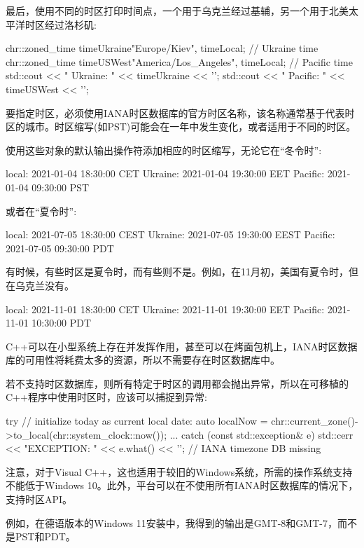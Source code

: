 
最后，使用不同的时区打印时间点，一个用于乌克兰经过基辅，另一个用于北美太平洋时区经过洛杉矶:

\begin{cpp}
chr::zoned_time timeUkraine{"Europe/Kiev", timeLocal}; // Ukraine time
chr::zoned_time timeUSWest{"America/Los_Angeles", timeLocal}; // Pacific time
std::cout << " Ukraine: " << timeUkraine << '\n';
std::cout << " Pacific: " << timeUSWest << '\n';
\end{cpp}

要指定时区，必须使用IANA时区数据库的官方时区名称，该名称通常基于代表时区的城市。时区缩写(如PST)可能会在一年中发生变化，或者适用于不同的时区。

使用这些对象的默认输出操作符添加相应的时区缩写，无论它在“冬令时”:

\begin{shell}
local:   2021-01-04 18:30:00 CET
Ukraine: 2021-01-04 19:30:00 EET
Pacific: 2021-01-04 09:30:00 PST
\end{shell}

或者在“夏令时”:

\begin{shell}
local:   2021-07-05 18:30:00 CEST
Ukraine: 2021-07-05 19:30:00 EEST
Pacific: 2021-07-05 09:30:00 PDT
\end{shell}

有时候，有些时区是夏令时，而有些则不是。例如，在11月初，美国有夏令时，但在乌克兰没有。

\begin{shell}
local:   2021-11-01 18:30:00 CET
Ukraine: 2021-11-01 19:30:00 EET
Pacific: 2021-11-01 10:30:00 PDT
\end{shell}


C++可以在小型系统上存在并发挥作用，甚至可以在烤面包机上，IANA时区数据库的可用性将耗费太多的资源，所以不需要存在时区数据库中。

若不支持时区数据库，则所有特定于时区的调用都会抛出异常，所以在可移植的C++程序中使用时区时，应该可以捕捉到异常:

\begin{cpp}
try {
	// initialize today as current local date:
	auto localNow = chr::current_zone()->to_local(chr::system_clock::now());
	...
}
catch (const std::exception& e) {
	std::cerr << "EXCEPTION: " << e.what() << '\n'; // IANA timezone DB missing
}
\end{cpp}

注意，对于Visual C++，这也适用于较旧的Windows系统，所需的操作系统支持不能低于Windows 10。此外，平台可以在不使用所有IANA时区数据库的情况下，支持时区API。

例如，在德语版本的Windows 11安装中，我得到的输出是GMT-8和GMT-7，而不是PST和PDT。















